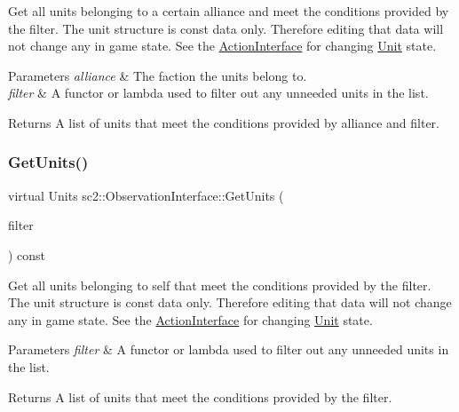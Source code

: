 Get all units belonging to a certain alliance and meet the conditions provided by the filter. The unit structure is const data only. Therefore editing that data will not change any in game state. See the \hyperlink{classsc2_1_1_action_interface}{Action\+Interface} for changing \hyperlink{classsc2_1_1_unit}{Unit} state. 
\begin{DoxyParams}{Parameters}
{\em alliance} & The faction the units belong to. \\
\hline
{\em filter} & A functor or lambda used to filter out any unneeded units in the list. \\
\hline
\end{DoxyParams}
\begin{DoxyReturn}{Returns}
A list of units that meet the conditions provided by alliance and filter. 
\end{DoxyReturn}
\mbox{\label{classsc2_1_1_observation_interface_ab0d22edc6bd276b8e9d27387294fdc88}} 
\subsubsection{\texorpdfstring{Get\+Units()}{GetUnits()}\hspace{0.1cm}{\footnotesize\ttfamily [3/3]}}
{\footnotesize\ttfamily virtual Units sc2\+::\+Observation\+Interface\+::\+Get\+Units (\begin{DoxyParamCaption}\item[{\hyperlink{sc2__interfaces_8h_af4abbeea3291e718cf2283e1390f3670}{Filter}}]{filter }\end{DoxyParamCaption}) const\hspace{0.3cm}{\ttfamily [pure virtual]}}

Get all units belonging to self that meet the conditions provided by the filter. The unit structure is const data only. Therefore editing that data will not change any in game state. See the \hyperlink{classsc2_1_1_action_interface}{Action\+Interface} for changing \hyperlink{classsc2_1_1_unit}{Unit} state. 
\begin{DoxyParams}{Parameters}
{\em filter} & A functor or lambda used to filter out any unneeded units in the list. \\
\hline
\end{DoxyParams}
\begin{DoxyReturn}{Returns}
A list of units that meet the conditions provided by the filter. 
\end{DoxyReturn}
\mbox{\label{classsc2_1_1_observation_interface_a30cdffc5d5c87797c5c154fe50bad768}} 
